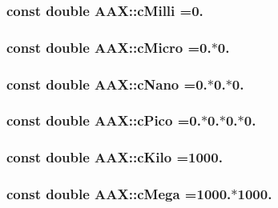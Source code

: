 \subsubsection[{c\+Milli}]{\setlength{\rightskip}{0pt plus 5cm}const double A\+A\+X\+::c\+Milli =0.}\label{a00288_a1b66f305f76b3f27b75c275c805c3d9b}
\hypertarget{a00288_a661c2b5af007244eb8ffcefdae2608d0}{}
\subsubsection[{c\+Micro}]{\setlength{\rightskip}{0pt plus 5cm}const double A\+A\+X\+::c\+Micro =0.$\ast$0.}\label{a00288_a661c2b5af007244eb8ffcefdae2608d0}
\hypertarget{a00288_a3227cf335c40f4afcc72efd8f774ac92}{}
\subsubsection[{c\+Nano}]{\setlength{\rightskip}{0pt plus 5cm}const double A\+A\+X\+::c\+Nano =0.$\ast$0.$\ast$0.}\label{a00288_a3227cf335c40f4afcc72efd8f774ac92}
\hypertarget{a00288_a480023c4a430fed889626b81c66d7589}{}
\subsubsection[{c\+Pico}]{\setlength{\rightskip}{0pt plus 5cm}const double A\+A\+X\+::c\+Pico =0.$\ast$0.$\ast$0.$\ast$0.}\label{a00288_a480023c4a430fed889626b81c66d7589}
\hypertarget{a00288_aa151b1429ed5eabb4000d1b13e47a5c2}{}
\subsubsection[{c\+Kilo}]{\setlength{\rightskip}{0pt plus 5cm}const double A\+A\+X\+::c\+Kilo =1000.}\label{a00288_aa151b1429ed5eabb4000d1b13e47a5c2}
\hypertarget{a00288_ad20650c749492b31ef48b41ac84f57e9}{}
\subsubsection[{c\+Mega}]{\setlength{\rightskip}{0pt plus 5cm}const double A\+A\+X\+::c\+Mega =1000.$\ast$1000.}\label{a00288_ad20650c749492b31ef48b41ac84f57e9}
\hypertarget{a00288_ae5910a5df81de70f784c2fd073f70422}{}
